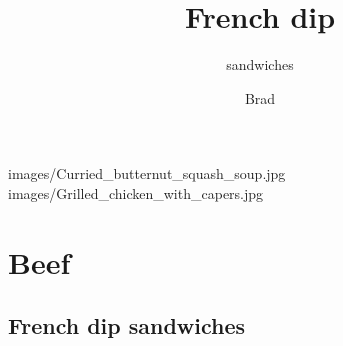 \documentclass{RecipeBook}
\begin{document}
	{images/Curried_butternut_squash_soup.jpg}
	{images/Grilled_chicken_with_capers.jpg}
	
\makecontents

\pagestyle{recipe}

\section{Beef}
\subsection{French dip sandwiches}
\author{Brad}
\title{French dip}
\subtitle{\hspace*{0.75in}sandwiches}
\end{document}

